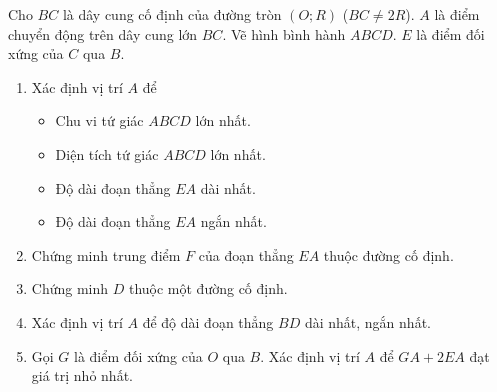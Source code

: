 \begin{bt}%
	Cho $BC$ là dây cung cố định của đường tròn $(O;R)$ ($BC\ne 2R$). $A$ là điểm chuyển động trên dây cung lớn $BC$. Vẽ hình bình hành $ABCD$. $E$ là điểm đối xứng của $C$ qua $B$.
	\begin{enumerate}
		\item Xác định vị trí $A$ để
		\begin{itemize}
			\item Chu vi tứ giác $ABCD$ lớn nhất.
			\item Diện tích tứ giác $ABCD$ lớn nhất.
			\item Độ dài đoạn thẳng $EA$ dài nhất.
			\item Độ dài đoạn thẳng $EA$ ngắn nhất.
		\end{itemize}
		\item Chứng minh trung điểm $F$ của đoạn thẳng $EA$ thuộc đường cố định.
		\item Chứng minh $D$ thuộc một đường cố định.
		\item Xác định vị trí $A$ để độ dài đoạn thẳng $BD$ dài nhất, ngắn nhất.
		\item Gọi $G$ là điểm đối xứng của $O$ qua $B$. Xác định vị trí $A$ để $GA+2EA$ đạt giá trị nhỏ nhất.
	\end{enumerate}
\end{bt}
